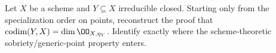 \begin{problem}\label{chal:vi31-02}
Let $X$ be a scheme and $Y\subseteq X$ irreducible closed. Starting only from the specialization order on points, reconstruct the proof that $\operatorname{codim}(Y,X)=\dim\OO_{X,\eta_Y}$. Identify exactly where the scheme-theoretic sobriety/generic-point property enters.
\end{problem}
